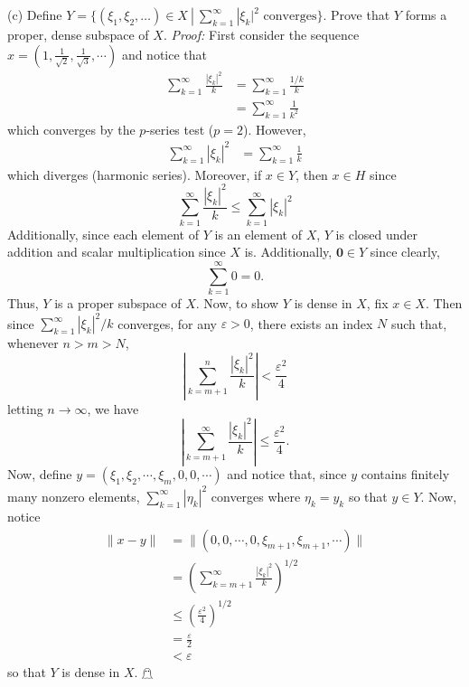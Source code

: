 \documentclass{article}
\begin{document}
\begin{itemize}
    (c) Define $Y = \{(\xi_1, \xi_2, \dots) \in X \: | \: \sum_{k=1}^{\infty} |\xi_k|^2 \text{  converges}\}$. Prove that $Y$ forms a proper, dense subspace of $X$.
    \newline\newline
    \textit{Proof:} First consider the sequence $x = \left(1, \frac{1}{\sqrt{2}}, \frac{1}{\sqrt{3}}, \cdots \right)$ and notice that
    \begin{align*}
        \sum_{k = 1}^{\infty} \frac{|\xi_k|^2}{k} &= \sum_{k = 1}^{\infty} \frac{1/k}{k}\\
        &= \sum_{k = 1}^{\infty} \frac{1}{k^2}
    \end{align*}
    which converges by the $p$-series test ($p = 2$). However, 
    \begin{align*}
        \sum_{k = 1}^{\infty} |\xi_k|^2 &= \sum_{k = 1}^{\infty} \frac{1}{k}
    \end{align*}
    which diverges (harmonic series). Moreover, if $x \in Y$, then $x \in H$ since 
    \[\sum_{k =1}^{\infty} \frac{|\xi_k|^2}{k} \leq \sum_{k = 1}^{\infty} |\xi_k|^2\]
    Additionally, since each element of $Y$ is an element of $X$, $Y$ is closed under addition and scalar multiplication since $X$ is. Additionally, $\mathbf{0} \in Y$ since clearly,
    \[\sum_{k = 1}^{\infty} 0 = 0.\]
    Thus, $Y$ is a proper subspace of $X$. Now, to show $Y$ is dense in $X$, fix $x \in X$. Then since $\sum_{k = 1}^{\infty} |\xi_k|^2/k$ converges, for any $\varepsilon > 0$, there exists an index $N$ such that, whenever $n > m > N$,
    \[\left|\sum_{k = m+1}^n \frac{|\xi_k|^2}{k}\right| < \frac{\varepsilon^2}{4}\]
    letting $n \to \infty$, we have
    \[\left|\sum_{k = m+1}^{\infty} \frac{|\xi_k|^2}{k}\right| \leq \frac{\varepsilon^2}{4}.\]
    Now, define $y = (\xi_1, \xi_2, \cdots, \xi_m, 0, 0, \cdots)$ and notice that, since $y$ contains finitely many nonzero elements, $\sum_{k = 1}^{\infty} |\eta_k|^2$ converges where $\eta_k = y_k$ so that $y \in Y$. Now, notice
    \begin{align*}
        \|x - y\| &= \|(0,0,\cdots, 0, \xi_{m+1}, \xi_{m+1}, \cdots)\|\\
        &= \left(\sum_{k = m+1}^{\infty} \frac{|\xi_k|^2}{k}\right)^{1/2}\\
        &\leq \left(\frac{\varepsilon^2}{4}\right)^{1/2}\\
        &= \frac{\varepsilon}{2}\\
        &< \varepsilon
    \end{align*}
    so that $Y$ is dense in $X$. \hfill $\mathghost$
    \pagebreak


\end{itemize}
\end{document}
